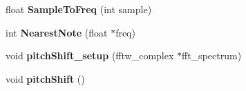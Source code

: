 \begin{DoxyCompactItemize}
\item 
\hypertarget{classvocoder_a2b3a6e386d3a18f9366320e5743d33b1}{float {\bfseries Sample\-To\-Freq} (int sample)}\label{classvocoder_a2b3a6e386d3a18f9366320e5743d33b1}

\item 
\hypertarget{classvocoder_a8b1e51e28458338abc0eeaac00c1842f}{int {\bfseries Nearest\-Note} (float $\ast$freq)}\label{classvocoder_a8b1e51e28458338abc0eeaac00c1842f}

\item 
\hypertarget{classvocoder_aa3d122aee6d6ae77ac5b04572e924dc0}{void {\bfseries pitch\-Shift\-\_\-setup} (fftw\-\_\-complex $\ast$fft\-\_\-spectrum)}\label{classvocoder_aa3d122aee6d6ae77ac5b04572e924dc0}

\item 
\hypertarget{classvocoder_aa218678a51da7429066c32e59edd5057}{void {\bfseries pitch\-Shift} ()}\label{classvocoder_aa218678a51da7429066c32e59edd5057}

\end{DoxyCompactItemize}
